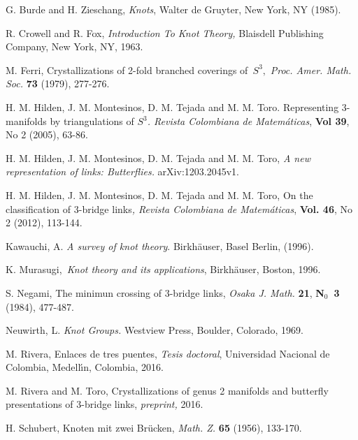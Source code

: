 \documentclass[12pt]{article}%
\providecommand{\U}[1]{\protect\rule{.1in}{.1in}}
\begin{document}
\begin{thebibliography}{99}                                                                                               %


G. Burde and H. Zieschang, \textit{Knots}, Walter de Gruyter,
New York, NY (1985).

R. Crowell and R. Fox, \textit{Introduction To Knot Theory,
}Blaisdell Publishing Company, New York, NY, 1963.

M. Ferri, Crystallizations of 2-fold branched coverings
of\textit{\ }$S^{3},$ \textit{Proc. Amer. Math. Soc.} \textbf{73} (1979), 277-276.

H. M. Hilden, J. M. Montesinos, D. M. Tejada and M. M. Toro.
Representing 3-manifolds by triangulations of $S%
{{}^3}%
$\textit{. Revista Colombiana de Matem\'{a}ticas}, \textbf{Vol 39}, No 2
(2005), 63-86.

H. M. Hilden, J. M. Montesinos, D. M. Tejada and M. M. Toro,
\textit{A new representation of links: Butterflies. }arXiv:1203.2045v1.

H. M. Hilden, J. M. Montesinos, D. M. Tejada and M. M. Toro,
On the classification of 3-bridge links\textit{, Revista Colombiana de
Matem\'{a}ticas}, \textbf{Vol. 46}, No 2 (2012), 113-144.

Kawauchi, A. \textit{A survey of knot theory}. Birkh\"{a}user,
Basel Berlin, (1996).

K. Murasugi,\textit{\ Knot theory and its applications},
Birkh\"{a}user, Boston, 1996.

S. Negami, The minimun crossing of 3-bridge links,
\textit{Osaka J. Math.} \textbf{21}, \textbf{N}$_{0}$\textbf{\ 3} (1984), 477-487.

Neuwirth, L. \textit{Knot Groups. }Westview Press, Boulder,
Colorado, 1969.

M. Rivera, Enlaces de tres puentes, \textit{Tesis doctoral},
Universidad Nacional de Colombia, Medell\'{\i}n, Colombia, 2016.

M. Rivera and M. Toro, Crystallizations of genus 2 manifolds
and butterfly presentations of 3-bridge links, \textit{preprint, }2016.

H. Schubert, Knoten mit zwei Br\"{u}cken, \textit{Math. Z.
}\textbf{65} (1956), 133-170.
\end{thebibliography}
\end{document}
